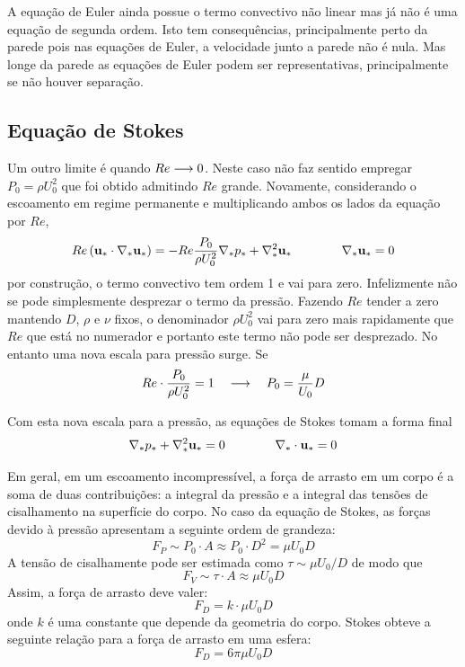 A equação de Euler ainda possue o termo convectivo não linear mas já não é uma equação de segunda ordem. Isto tem consequências, principalmente perto da parede pois nas equações de Euler, a velocidade junto a parede não é nula. Mas longe da parede as equações de Euler podem ser representativas, principalmente se não houver separação.

\subsection{Equação de Stokes}
Um outro limite é quando $Re\longrightarrow 0$. Neste caso não faz sentido empregar $P_0 = \rho U_0^2$ que foi obtido admitindo $Re$ grande. Novamente, considerando o escoamento em regime permanente e multiplicando ambos os lados da equação por $Re$, 
\[
Re\left( \mathbf{u}_*\cdot\nabla_* \mathbf{u_*}\right) = -Re\frac{P_0}{\rho U_0^2}\nabla_* p_* + \nabla_*^2 \mathbf{u}_* \qquad\qquad \nabla_* \mathbf{u}_* = 0
\]
por construção, o termo convectivo tem ordem 1 e  vai para zero. Infelizmente não se pode simplesmente desprezar o termo da pressão. Fazendo $Re$ tender a zero mantendo $D$, $\rho$ e $\nu$ fixos, o denominador $\rho U_0^2$ vai para zero mais rapidamente que $Re$ que está no numerador e portanto este termo não pode ser desprezado. No entanto uma nova escala para pressão surge. Se
\[
Re\cdot\frac{P_0}{\rho U_0^2} = 1 \quad\longrightarrow\quad P_0 = \frac{\mu}{U_0}{D}
\]

Com esta nova escala para a pressão, as equações de Stokes tomam a forma final
\begin{equation}
\nabla_* p_* + \nabla_*^2 \mathbf{u}_* = 0 \qquad\qquad \nabla_*\cdot \mathbf{u}_* = 0
\label{eq:stokes}
\end{equation}

Em geral, em um escoamento incompressível, a força de arrasto em um corpo é a soma de duas contribuições: a integral da pressão e a integral das tensões de cisalhamento na superfície do corpo. No caso da equação de Stokes, as forças devido à pressão apresentam a seguinte ordem de grandeza:
\[
F_P \sim P_0 \cdot A \approx P_0 \cdot D^2 =\mu U_0 D
\]
A tensão de cisalhamente pode ser estimada como $\tau \sim \mu U_0 / D$ de modo que 
\[
F_V \sim \tau \cdot A \approx \mu U_0 D
\]
Assim, a força de arrasto deve valer:
\[
F_D = k \cdot \mu U_0 D
\]
onde $k$ é uma constante que depende da geometria do corpo. Stokes obteve a seguinte relação para a força de arrasto em uma esfera:
\begin{equation}
F_D = 6\pi\mu U_0 D
\label{eq:cdstokes}
\end{equation}

